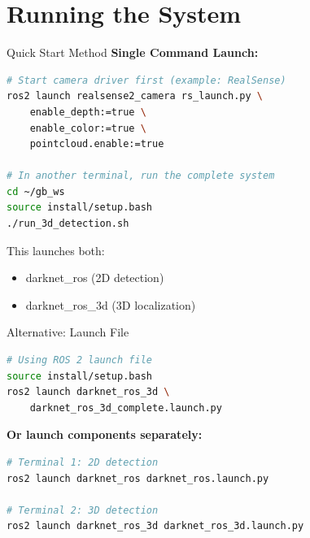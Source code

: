 \documentclass[aspectratio=169]{beamer}
\begin{document}
\section{Running the System}

\begin{frame}[fragile]{Quick Start Method}
\textbf{Single Command Launch:}

\begin{lstlisting}[language=bash]
# Start camera driver first (example: RealSense)
ros2 launch realsense2_camera rs_launch.py \
    enable_depth:=true \
    enable_color:=true \
    pointcloud.enable:=true

# In another terminal, run the complete system
cd ~/gb_ws
source install/setup.bash
./run_3d_detection.sh
\end{lstlisting}

\vspace{1em}
This launches both:
\begin{itemize}
    \item darknet\_ros (2D detection)
    \item darknet\_ros\_3d (3D localization)
\end{itemize}
\end{frame}

\begin{frame}[fragile]{Alternative: Launch File}
\begin{lstlisting}[language=bash]
# Using ROS 2 launch file
source install/setup.bash
ros2 launch darknet_ros_3d \
    darknet_ros_3d_complete.launch.py
\end{lstlisting}

\vspace{1em}
\textbf{Or launch components separately:}

\begin{lstlisting}[language=bash]
# Terminal 1: 2D detection
ros2 launch darknet_ros darknet_ros.launch.py

# Terminal 2: 3D detection
ros2 launch darknet_ros_3d darknet_ros_3d.launch.py
\end{lstlisting}
\end{frame}
\end{document}
